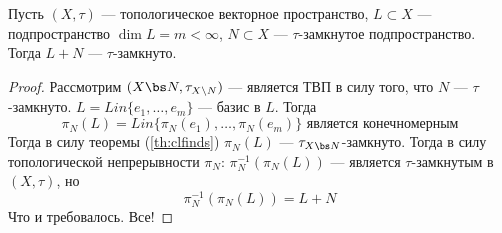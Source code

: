 \begin{theorem}
	Пусть $(X, \tau)$ --- топологическое векторное пространство, $L \subset X$ --- подпространство $\dim L = m < \infty$, $N \subset X$ --- $\tau$-замкнутое подпространство. Тогда $L + N$ --- $\tau$-замкнуто.
\end{theorem}
\begin{proof}
	Рассмотрим $(X \bs N, \tau_{X \backslash N})$ --- является ТВП в силу того, что $N$ --- $\tau$-замкнуто. $L = Lin\{e_1, \dots , e_m\}$ --- базис в $L$. Тогда 
	$$
	\pi_N(L) = Lin \{\pi_N(e_1), \dots, \pi_N(e_m)\} \text{ является конечномерным}
	$$
	Тогда в силу теоремы (\ref{th:clfinds}) $\pi_N(L)$ --- $\tau_{X \bs N}$-замкнуто. Тогда в силу топологической непрерывности $\pi_N$: $\pi_N^{-1}(\pi_N(L))$ --- является $\tau$-замкнутым в $(X, \tau)$, но 
	$$
	\pi_N^{-1}(\pi_N(L)) = L + N
	$$
	Что и требовалось. Все!
\end{proof}